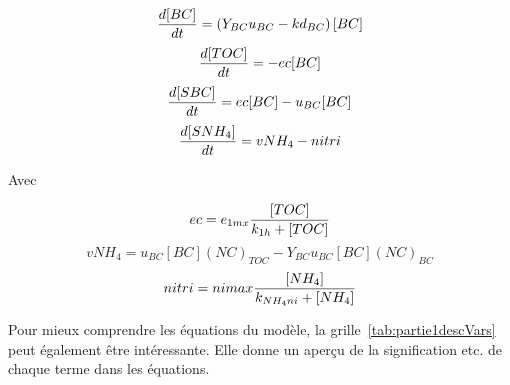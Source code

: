 \begin{equation}
  {{d[BC]}\over{dt}} =
  \left ( Y_{BC} u_{BC} - kd_{BC} \right ) [BC]
  \label{eq:eq1}
\end{equation}
\begin{equation}
  {{d[TOC]}\over{dt}} =
  -ec [BC]
  \label{eq:eq2}
\end{equation}
\begin{equation}
  {{d[SBC]}\over{dt}} =
  ec [BC] - u_{BC} [BC]
  \label{eq:eq3}
\end{equation}
\begin{equation}
  {{d[SNH_4]}\over{dt}} =
  vNH_4 - nitri
  \label{eq:eq4}
\end{equation}

\par{
Avec
}

\begin{equation}
  ec = e_{1mx} {{[TOC]}\over{k_{1h} + [TOC]}}
  \label{eq:eq5}
\end{equation}
\begin{equation}
  vNH_4 = u_{BC} [BC] (NC)_{TOC} - Y_{BC} u_{BC} [BC] (NC)_{BC}
  \label{eq:eq6}
\end{equation}
\begin{equation}
  nitri = nimax {{[NH_4]}\over{k_{NH_4ni}+[NH_4]}}
  \label{eq:eq7}
\end{equation}

\par{
Pour mieux comprendre les équations du modèle, la grille~\ref{tab:partie1descVars} peut également être
intéressante. Elle donne un aperçu de la signification etc. de chaque terme dans les équations.
}

